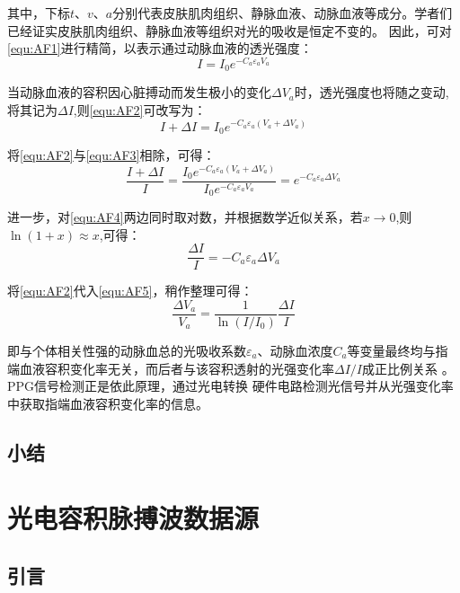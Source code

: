 其中，下标$t$、$v$、$a$分别代表皮肤肌肉组织、静脉血液、动脉血液等成分。学者们已经证实皮肤肌肉组织、静脉血液等组织对光的吸收是恒定不变的\cite{1980Spectrophotometric,4122392}。
因此，可对\autoref{equ:AF1}进行精简，以表示通过动脉血液的透光强度\cite{PPGYY}：
\begin{equation}
    \label{equ:AF2}
    I=I_{0}e^{-C_{a}\varepsilon _{a}V_{a}} 
\end{equation}

当动脉血液的容积因心脏搏动而发生极小的变化$\Delta V_{a}$时，透光强度也将随之变动,将其记为$\Delta I$,则\autoref{equ:AF2}可改写为：
\begin{equation}
    \label{equ:AF3}
    I+\Delta I=I_{0}e^{-C_{a}\varepsilon _{a}(V_{a}+\Delta V_{a})} 
\end{equation}

将\autoref{equ:AF2}与\autoref{equ:AF3}相除，可得：
\begin{equation}
    \label{equ:AF4}
    \frac{I+\Delta I}{I}=\frac{I_{0}e^{-C_{a}\varepsilon _{a}(V_{a}+\Delta V_{a})}}{I_{0}e^{-C_{a}\varepsilon _{a}V_{a}}}=e^{-C_{a}\varepsilon _{a}\Delta V_{a}} 
\end{equation}

进一步，对\autoref{equ:AF4}两边同时取对数，并根据数学近似关系，若$x\rightarrow 0$,则$\ln(1+x)\approx x$,可得：
\begin{equation}
    \label{equ:AF5}
    \frac{\Delta I}{I}=-C_{a}\varepsilon _{a}\Delta V_{a}
\end{equation}

将\autoref{equ:AF2}代入\autoref{equ:AF5}，稍作整理可得：
\begin{equation}
    \label{equ:AF6}
    \frac{\Delta V_{a}}{V_{a}}=\frac{1}{\ln(I/I_{0})}\frac{\Delta I}{I}
\end{equation}

即与个体相关性强的动脉血总的光吸收系数$\varepsilon _{a}$、动脉血浓度$C_{a}$等变量最终均与指端血液容积变化率无关，而后者与该容积透射的光强变化率$\Delta I/I$成正比例关系
\cite{1980Spectrophotometric,4122392,PPGYY}。PPG信号检测正是依此原理，通过光电转换
硬件电路检测光信号并从光强变化率中获取指端血液容积变化率的信息。
\section{小结}

\chapter{光电容积脉搏波数据源}
\section{引言}

